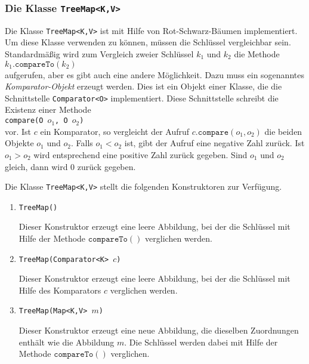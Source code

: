 \subsubsection{Die Klasse \texttt{TreeMap<K,V>}}
Die Klasse \texttt{TreeMap<K,V>} ist mit Hilfe von Rot-Schwarz-B\"aumen implementiert.  Um diese
Klasse verwenden zu k\"onnen, m\"ussen die Schl\"ussel vergleichbar sein.  Standardm\"a{\ss}ig wird
zum Vergleich zweier Schl\"ussel $k_1$ und $k_2$ die Methode
\\[0.2cm]
\hspace*{1.3cm} $k_1.\mathtt{compareTo}(k_2)$
\\[0.2cm]
aufgerufen, aber es gibt auch eine andere M\"oglichkeit.  Dazu muss ein sogenanntes
\emph{Komparator-Objekt} erzeugt werden.  Dies ist ein Objekt einer Klasse, die die Schnittstelle
\texttt{Comparator<O>} implementiert.  Diese Schnittstelle schreibt die Existenz einer
Methode
\\[0.2cm]
\hspace*{1.3cm} \texttt{compare(O $o_1$, O $o_2$)} \\[0.2cm]
vor.  Ist $c$ ein Komparator, so vergleicht der Aufruf $c.\mathtt{compare}(o_1, o_2)$ die
beiden Objekte $o_1$ und $o_2$.  Falls $o_1 < o_2$ ist, gibt der Aufruf eine negative Zahl
zur\"uck.  Ist $o_1 > o_2$ wird entsprechend eine positive Zahl zur\"uck gegeben.  Sind $o_1$
und $o_2$ gleich, dann wird 0 zur\"uck gegeben.

Die Klasse \texttt{TreeMap<K,V>} stellt die folgenden Konstruktoren zur Verf\"ugung.
\begin{enumerate}
\item \texttt{TreeMap()}

      Dieser Konstruktor erzeugt eine leere Abbildung, bei der die Schl\"ussel mit Hilfe der
      Methode $\mathtt{compareTo}()$ verglichen werden.
\item \texttt{TreeMap(Comparator<K> $c$)}
  
      Dieser Konstruktor erzeugt eine leere Abbildung, bei der die Schl\"ussel mit Hilfe des
      Komparators $c$ verglichen werden.
\item \texttt{TreeMap(Map<K,V> $m$)}

      Dieser Konstruktor erzeugt eine neue Abbildung, die dieselben Zuordnungen enth\"alt 
      wie die Abbildung $m$.  Die Schl\"ussel werden dabei mit Hilfe der
      Methode $\mathtt{compareTo}()$ verglichen.
\end{enumerate}

